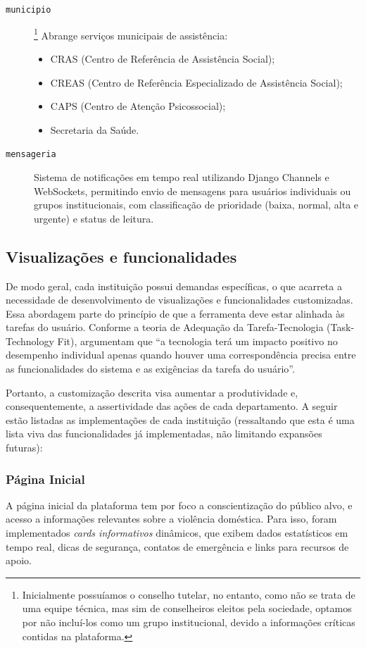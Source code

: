 \begin{description}
   \item[\texttt{municipio}]\footnote{Inicialmente possuíamos o conselho tutelar, no entanto, como não se trata de uma equipe técnica, mas sim de conselheiros eleitos pela sociedade, optamos por não incluí-los como um grupo institucional, devido a informações críticas contidas na plataforma.} Abrange serviços municipais de assistência:
   \begin{itemize}
      \item CRAS (Centro de Referência de Assistência Social);
      \item CREAS (Centro de Referência Especializado de Assistência Social);
      \item CAPS (Centro de Atenção Psicossocial);
      \item Secretaria da Saúde.
   \end{itemize}
   
   \item[\texttt{mensageria}] Sistema de notificações em tempo real utilizando Django Channels e WebSockets, permitindo envio de mensagens para usuários individuais ou grupos institucionais, com classificação de prioridade (baixa, normal, alta e urgente) e status de leitura.
\end{description}

\subsection{Visualizações e funcionalidades}
\par De modo geral, cada instituição possui demandas específicas, o que acarreta a necessidade de desenvolvimento de visualizações e funcionalidades customizadas. Essa abordagem parte do princípio de que a ferramenta deve estar alinhada às tarefas do usuário. Conforme a teoria de Adequação da Tarefa-Tecnologia (Task-Technology Fit),  argumentam que ``a tecnologia terá um impacto positivo no desempenho individual apenas quando houver uma correspondência precisa entre as funcionalidades do sistema e as exigências da tarefa do usuário''.

\par Portanto, a customização descrita visa aumentar a produtividade e, consequentemente, a assertividade das ações de cada departamento. A seguir estão listadas as implementações de cada instituição (ressaltando que esta é uma lista viva das funcionalidades já implementadas, não limitando expansões futuras):

\subsubsection{Página Inicial}
\par A página inicial da plataforma tem por foco a conscientização do público alvo, e acesso a informações relevantes sobre a violência doméstica. Para isso, foram implementados \textit{cards informativos} dinâmicos, que exibem dados estatísticos em tempo real, dicas de segurança, contatos de emergência e links para recursos de apoio.

